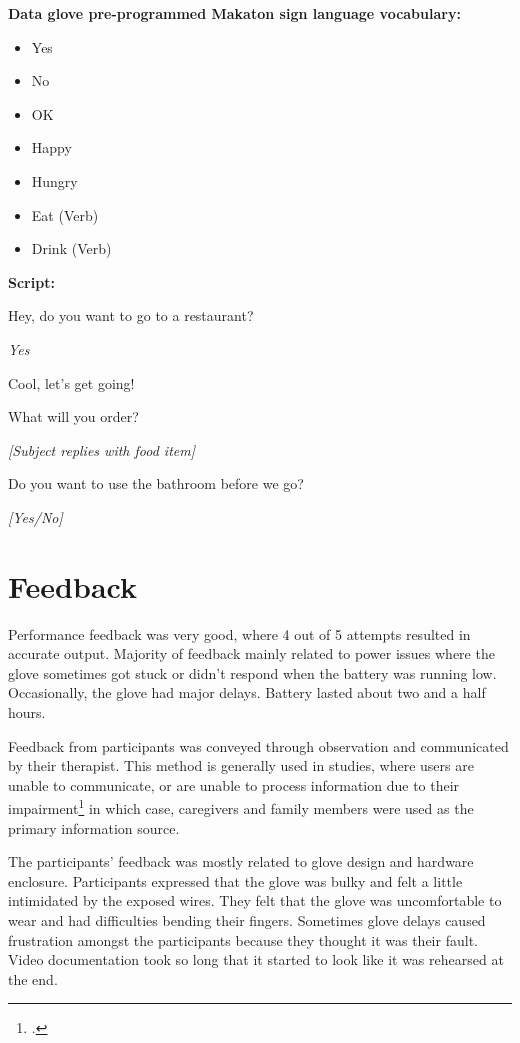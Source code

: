 \textbf{Data glove pre-programmed Makaton sign language vocabulary:}

\begin{itemize}
  \item Yes
  \item No
  \item OK
  \item Happy
  \item Hungry
  \item Eat (Verb)
  \item Drink (Verb)
\end{itemize}

\textbf{Script:}

\begin{description}
  \item Hey, do you want to go to a restaurant?
  \item \textit{Yes}
  \item Cool, let's get going!
  \item What will you order?
  \item \textit{[Subject replies with food item]}
  \item Do you want to use the bathroom before we go?
  \item \textit{[Yes/No]}
\end{description}

\section{Feedback} 

Performance feedback was very good, where 4 out of 5 attempts resulted in accurate output. Majority of feedback mainly related to power issues where the glove sometimes got stuck or didn't respond when the battery was running low. Occasionally, the glove had major delays. Battery lasted about two and a half hours. 

Feedback from participants was conveyed through observation and communicated by their therapist. This method is generally used in studies, where users are unable to communicate, or are unable to process information due to their impairment\footcite{Lazar2010} in which case, caregivers and family members were used as the primary information source. 

The participants' feedback was mostly related to glove design and hardware enclosure. Participants expressed that the glove was bulky and felt a little intimidated by the exposed wires. They felt that the glove was uncomfortable to wear and had difficulties bending their fingers. Sometimes glove delays caused frustration amongst the participants because they thought it was their fault. Video documentation took so long that it started to look like it was rehearsed at the end. 

